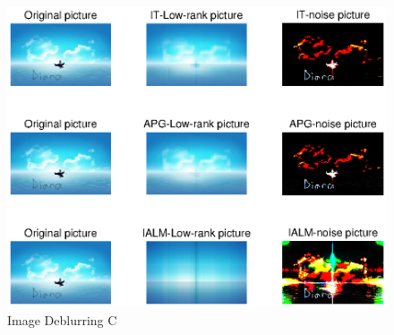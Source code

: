 \documentclass[UTF8]{report}
\begin{document}
\begin{figure}
\centering
\includegraphics{Image Deblurring C.eps}
\caption{Image Deblurring C}
\label{3}
\end{figure} 
\end{document}
